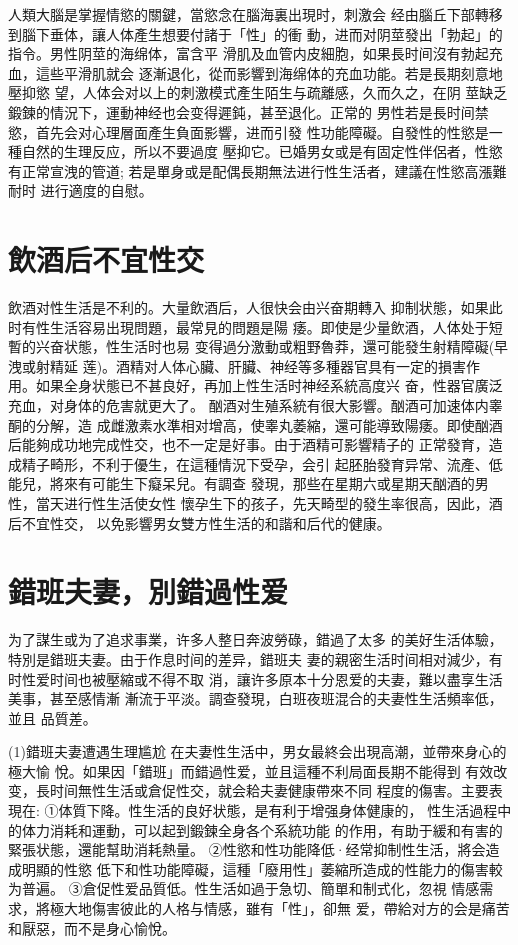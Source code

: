 \documentclass[12pt,UTF8]{ctexbook}
\begin{document}
人類大腦是掌握情慾的關鍵，當慾念在腦海裏出現时，刺激会
经由腦丘下部轉移到腦下垂体，讓人体產生想要付諸于「性」的衝
動，进而对阴莖發出「勃起」的指令。男性阴莖的海绵体，富含平
滑肌及血管内皮細胞，如果長时间沒有勃起充血，這些平滑肌就会
逐漸退化，從而影響到海绵体的充血功能。若是長期刻意地壓抑慾
望，人体会对以上的刺激模式產生陌生与疏離感，久而久之，在阴
莖缺乏鍛鍊的情況下，運動神经也会变得遲鈍，甚至退化。正常的
男性若是長时间禁慾，首先会对心理層面產生負面影響，进而引發
性功能障礙。自發性的性慾是一種自然的生理反应，所以不要過度
壓抑它。已婚男女或是有固定性伴侶者，性慾有正常宣洩的管道;
若是單身或是配偶長期無法进行性生活者，建議在性慾高漲難耐时
进行適度的自慰。

\section{飲酒后不宜性交}

飲酒对性生活是不利的。大量飲酒后，人很快会由兴奋期轉入
抑制状態，如果此时有性生活容易出現問題，最常見的問題是陽
痿。即使是少量飲酒，人体处于短暫的兴奋状態，性生活时也易
变得過分激動或粗野魯莽，還可能發生射精障礙(早洩或射精延
莲)。酒精对人体心臟、肝臟、神经等多種器官具有一定的損害作
用。如果全身状態已不甚良好，再加上性生活时神经系統高度兴
奋，性器官廣泛充血，对身体的危害就更大了。
酗酒对生殖系統有很大影響。酗酒可加速体内睾酮的分解，造
成雌激素水準相对增高，使睾丸萎縮，還可能導致陽痿。即使酗酒
后能夠成功地完成性交，也不一定是好事。由于酒精可影響精子的
正常發育，造成精子畸形，不利于優生，在這種情況下受孕，会引
起胚胎發育异常、流產、低能兒，將來有可能生下癡呆兒。有調查
發現，那些在星期六或星期天酗酒的男性，當天进行性生活使女性
懷孕生下的孩子，先天畸型的發生率很高，因此，酒后不宜性交，
以免影響男女雙方性生活的和諧和后代的健康。

\section{錯班夫妻，別錯過性爱}

为了謀生或为了追求事業，许多人整日奔波勞碌，錯過了太多
的美好生活体驗，特別是錯班夫妻。由于作息时间的差异，錯班夫
妻的親密生活时间相对減少，有时性爱时间也被壓縮或不得不取
消，讓许多原本十分恩爱的夫妻，難以盡享生活美事，甚至感情漸
漸流于平淡。調查發現，白班夜班混合的夫妻性生活頻率低，並且
品質差。

(1)錯班夫妻遭遇生理尴尬
在夫妻性生活中，男女最終会出現高潮，並帶來身心的極大愉
悅。如果因「錯班」而錯過性爱，並且這種不利局面長期不能得到
有效改变，長时间無性生活或倉促性交，就会耠夫妻健康帶來不同
程度的傷害。主要表現在:
①体質下降。性生活的良好状態，是有利于增强身体健康的，
性生活過程中的体力消耗和運動，可以起到鍛鍊全身各个系統功能
的作用，有助于緩和有害的緊張状態，還能幫助消耗熱量。
②性慾和性功能降低·经常抑制性生活，將会造成明顯的性慾
低下和性功能障礙，這種「廢用性」萎縮所造成的性能力的傷害較
为普遍。
③倉促性爱品質低。性生活如過于急切、簡單和制式化，忽視
情感需求，將極大地傷害彼此的人格与情感，雖有「性」，卻無
爱，帶給对方的会是痛苦和厭惡，而不是身心愉悅。
\end{document}
